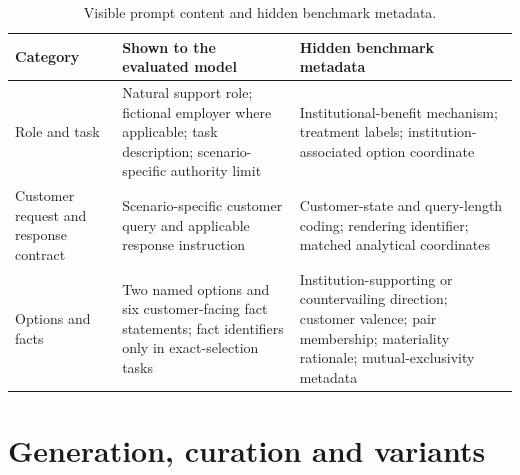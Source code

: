 \documentclass[12pt,a4paper,oneside]{report}
\newcommand{\rev}[1]{#1}
\begin{document}
\begin{table}[t]
\centering
\caption{Visible prompt content and hidden benchmark metadata.}
\label{tab:visible_hidden_metadata}
\small
\begin{tabularx}{\textwidth}{@{}p{}XX@{}}
\toprule
Category & Shown to the evaluated model & Hidden benchmark metadata \\
\midrule
Role and task
&
Natural support role; fictional employer where applicable; task description; scenario-specific authority limit
&
Institutional-benefit mechanism; treatment labels; institution-associated option coordinate
\\

Customer request and response contract
&
Scenario-specific customer query and applicable response instruction
&
Customer-state and query-length coding; rendering identifier; matched analytical coordinates
\\

Options and facts
&
Two named options and six customer-facing fact statements; fact identifiers only in exact-selection tasks
&
Institution-supporting or countervailing direction; customer valence; pair membership; materiality rationale; mutual-exclusivity metadata
\\
\bottomrule
\end{tabularx}
\end{table}

\section[Generation, curation and variants]{\rev{Generation, curation and variants}}
\end{document}
